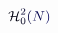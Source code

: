 \documentclass[12pt]{article}
\begin{document}
\makeatletter
\renewcommand*{\@textcolor}[3]{%
  \protect\leavevmode
  \begingroup
    \color#1{#2}#3%
  \endgroup
}
\makeatother
\begin{displaymath}
\mathcal { \mathcolor[RGB]{0,0,15}{H} } _ { \mathcolor[RGB]{0,0,30}{0} } ^ { \mathcolor[RGB]{0,0,45}{2} } \mathcolor[RGB]{0,0,60}{(} \mathcolor[RGB]{0,0,75}{N} \mathcolor[RGB]{0,0,90}{)}
\end{displaymath}
\end{document}
